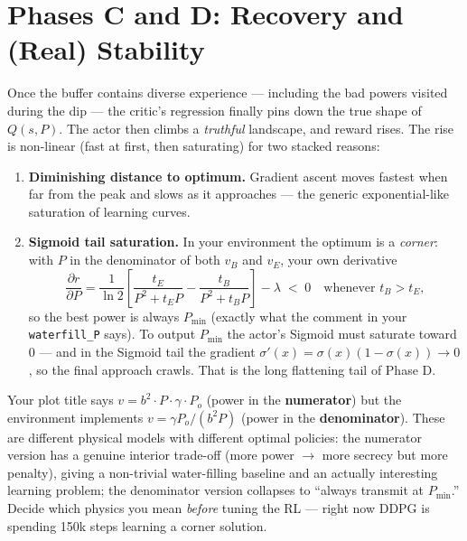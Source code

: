 \documentclass[11pt]{article}
\begin{document}
\section{Phases C and D: Recovery and (Real) Stability}

Once the buffer contains diverse experience --- including the bad powers visited
during the dip --- the critic's regression finally pins down the true shape of
$Q(s,P)$. The actor then climbs a \emph{truthful} landscape, and reward rises. The
rise is non-linear (fast at first, then saturating) for two stacked reasons:

\begin{enumerate}
\item \textbf{Diminishing distance to optimum.} Gradient ascent moves fastest when
      far from the peak and slows as it approaches --- the generic exponential-like
      saturation of learning curves.
\item \textbf{Sigmoid tail saturation.} In your environment the optimum is a
      \emph{corner}: with $P$ in the denominator of both $v_B$ and $v_E$, your own
      derivative
      \[
      \frac{\partial r}{\partial P}
      = \frac{1}{\ln 2}\left[\frac{t_E}{P^2+t_E P}-\frac{t_B}{P^2+t_B P}\right]-\lambda
      \;<\;0 \quad\text{whenever } t_B>t_E,
      \]
      so the best power is always $P_{\min}$ (exactly what the comment in your
      \texttt{waterfill\_P} says). To output $P_{\min}$ the actor's Sigmoid must
      saturate toward $0$ --- and in the Sigmoid tail the gradient
      $\sigma'(x)=\sigma(x)(1-\sigma(x))\to 0$, so the final approach crawls. That is
      the long flattening tail of Phase D.
\end{enumerate}

\begin{warnbox}
Your plot title says $v = b^2\cdot P\cdot\gamma\cdot P_o$ (power in the
\textbf{numerator}) but the environment implements $v = \gamma P_o/(b^2 P)$ (power in
the \textbf{denominator}). These are different physical models with different optimal
policies: the numerator version has a genuine interior trade-off (more power $\to$
more secrecy but more penalty), giving a non-trivial water-filling baseline and an
actually interesting learning problem; the denominator version collapses to
``always transmit at $P_{\min}$.'' Decide which physics you mean \emph{before}
tuning the RL --- right now DDPG is spending 150k steps learning a corner solution.
\end{warnbox}
\end{document}
